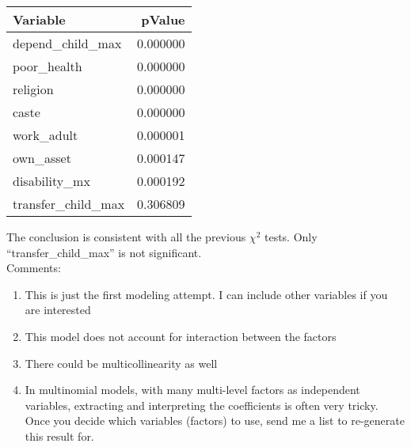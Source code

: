 \documentclass[11pt]{article}
\begin{document}
\begin{table}[ht]
\centering
\begin{tabular}{lr}
  \hline
Variable & pValue \\ 
  \hline
depend\_child\_max & 0.000000 \\ 
  poor\_health & 0.000000 \\ 
  religion & 0.000000 \\ 
  caste & 0.000000 \\ 
  work\_adult & 0.000001 \\ 
  own\_asset & 0.000147 \\ 
  disability\_mx & 0.000192 \\ 
  transfer\_child\_max & 0.306809 \\ 
   \hline
\end{tabular}
\end{table}
The conclusion is consistent with all the previous $\chi^2$ tests. Only ``transfer\_child\_max'' is not significant. 
\\
Comments:
\begin{enumerate}
\item This is just the first modeling attempt. I can include other variables if you are interested
\item This model does not account for interaction between the factors
\item There could be multicollinearity as well
\item In multinomial models, with many multi-level factors as independent variables, extracting and interpreting the coefficients is often very tricky. Once you decide which variables (factors) to use, send me a list to re-generate this result for. 
\end{enumerate}
\end{document}
